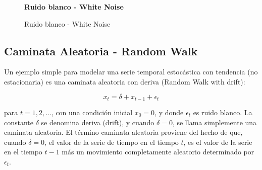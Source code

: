 \begin{figure}[H]
	\centering
	\textbf{Ruido blanco - White Noise}\par\medskip
	\caption{Ruido blanco - White Noise}\label{figura6}
\end{figure}

\subsection{Caminata Aleatoria - Random Walk}

Un ejemplo simple para modelar una serie temporal estoc\'astica con tendencia (no estacionaria) es una caminata aleatoria con deriva (Random Walk with drift):

\begin{equation*}
x_t = \delta + x_{t-1} + \epsilon_t 
\end{equation*}

para $t = 1, 2,. . .$, con una condici\'on inicial $x_0 = 0$, y donde $\epsilon_t$ es ruido blanco. La constante $\delta$ se denomina deriva (drift), y cuando $\delta=0$, se llama simplemente una caminata aleatoria. El t\'ermino caminata aleatoria proviene del hecho de que, cuando $\delta=0$, el valor de la serie de tiempo en el tiempo $t$, es el valor de la serie en el tiempo $t - 1$ m\'as un movimiento completamente aleatorio determinado por $\epsilon_t$. 

